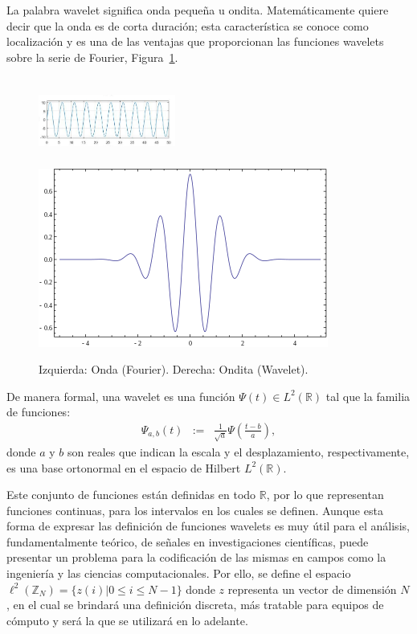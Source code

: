 \par La palabra wavelet significa onda peque\~na u ondita. Matem\'aticamente quiere decir que la onda es de corta duraci\'on; esta caracter\'istica se conoce como localizaci\'on y es una de las ventajas que proporcionan las funciones wavelets sobre la serie de Fourier, Figura~\ref{wav-fourier}.\\

\begin{figure}[h]
\center
\includegraphics[height=29mm, width=45mm]{Graphics/FourierOnda.png}
\includegraphics[scale=.33]{Graphics/FuncionWavelet.png}
\caption{Izquierda: Onda (Fourier). Derecha: Ondita (Wavelet).}
\label{wav-fourier}
\end{figure}

\begin{definition}
De manera formal, una wavelet es una funci\'on $\Psi(t)\in L^2(\mathbb{R})$ tal que la familia de funciones:
\begin{eqnarray}
\Psi_{a,b}(t)&:=&\frac{1}{\sqrt{a}}\Psi\left(\frac{t-b}{a}\right),\nonumber
\end{eqnarray}
donde $a$ y $b$ son reales que indican la escala y el desplazamiento, respectivamente, es una base ortonormal en el espacio de Hilbert $L^2(\mathbb{R})$.
\label{wav-continua}
\end{definition}

\par Este conjunto de funciones est\'an definidas en todo $\mathbb{R}$, por lo que representan funciones continuas, para los intervalos en los cuales se definen. Aunque esta forma de expresar las definici\'on de funciones wavelets es muy \'util para el an\'alisis, fundamentalmente te\'orico, de se\~nales en investigaciones cient\'ificas, puede presentar un problema para la codificaci\'on de las mismas en campos como la ingenier\'ia y las ciencias computacionales. Por ello, se define el espacio $\ell^2\left(\mathbb{Z}_N\right)=\{z(i)|0\leq i \leq N-1\}$ donde $z$ representa un vector de dimensi\'on $N$, en el cual se brindar\'a una definici\'on discreta, m\'as tratable para equipos de c\'omputo y ser\'a la que se utilizar\'a en lo adelante.\\

